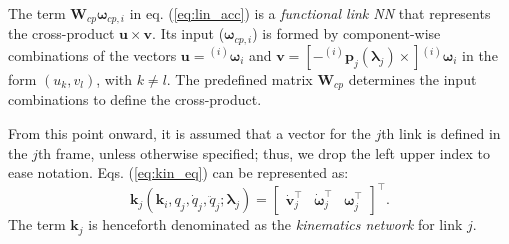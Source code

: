 The term $\bm{W}_{cp}\bm{\omega}_{cp,i}$ in eq. (\ref{eq:lin_acc}) is a \emph{functional link NN} \cite{PatraPalChaPan1999} that represents the cross-product $\bm{u}\times\bm{v}$. Its input ($\bm{\omega}_{cp,i}$) is formed by component-wise combinations of the vectors $\bm{u}={^{(i)}\bm{\omega}_{i}}$ and $\bm{v}=[-^{(i)}\bm{p}_j(\bm{\lambda}_j)\times]{^{(i)}\bm{\omega}_{i}}$ in the form $(u_k,v_l)$, with $k\neq l$. The predefined matrix $\bm{W}_{cp}$ determines the input combinations to define the cross-product.

From this point onward, it is assumed that a vector for the $j$th link is defined in the $j$th frame, unless otherwise specified; thus, we drop the left upper index to ease notation. Eqs. (\ref{eq:kin_eq}) can be represented as:
\begin{equation}
\bm{k}_j(\bm{k}_i,q_j,\dot{q}_j,\ddot{q}_j;\bm{\lambda}_j) =\begin{bmatrix} \dot{\bm{v}}^\intercal_j & \dot{\bm{\omega}}^\intercal_j & \bm{\omega}^\intercal_j\end{bmatrix}^\intercal.
\label{eq:kin_vector}
\end{equation}
The term $\bm{k}_j$ is henceforth denominated as the \emph{kinematics network} for link $j$.

